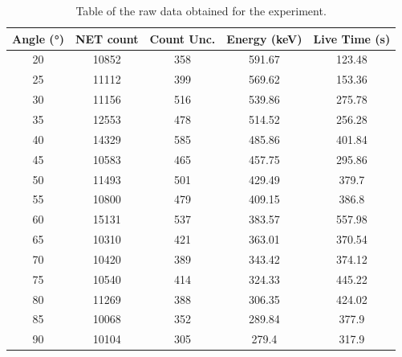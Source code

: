\documentclass[11pt, a4paper, twocolumn]{article}
\begin{document}
\begin{table}[H]
\centering
\caption{Table of the raw data obtained for the experiment.}
\label{tab:1}
\begin{tabular}{|c|c|c|c|c|}
\hline
\rowcolor[HTML]{EFEFEF} 
Angle (°) & NET count & Count Unc. & Energy (keV) & Live Time (s) \\ \hline
20        & 10852     & 358        & 591.67       & 123.48        \\ \hline
25        & 11112     & 399        & 569.62       & 153.36        \\ \hline
30        & 11156     & 516        & 539.86       & 275.78        \\ \hline
35        & 12553     & 478        & 514.52       & 256.28        \\ \hline
40        & 14329     & 585        & 485.86       & 401.84        \\ \hline
45        & 10583     & 465        & 457.75       & 295.86        \\ \hline
50        & 11493     & 501        & 429.49       & 379.7         \\ \hline
55        & 10800     & 479        & 409.15       & 386.8         \\ \hline
60        & 15131     & 537        & 383.57       & 557.98        \\ \hline
65        & 10310     & 421        & 363.01       & 370.54        \\ \hline
70        & 10420     & 389        & 343.42       & 374.12        \\ \hline
75        & 10540     & 414        & 324.33       & 445.22        \\ \hline
80        & 11269     & 388        & 306.35       & 424.02        \\ \hline
85        & 10068     & 352        & 289.84       & 377.9         \\ \hline
90        & 10104     & 305        & 279.4        & 317.9         \\ \hline
\end{tabular}
\end{table}



\end{document}
